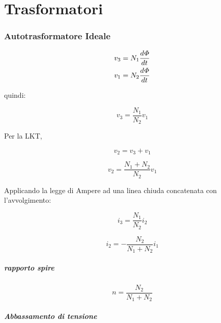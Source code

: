 \chapter{Trasformatori}

\subsection{Autotrasformatore Ideale}

\begin{equation}
  \begin{split}
    v_3 = N_1 \frac{d^{} \varPhi}{d t^{}} \\
    v_1 = N_2 \frac{d^{} \varPhi}{d t^{}}
  \end{split}
\end{equation}

quindi:

\begin{equation}
  v_3 = \frac{N_1}{N_2} v_1
\end{equation}

Per la LKT,

\begin{equation}
  v_2 = v_3 + v_1
\end{equation}

\begin{equation}
  \boxed{
    v_2 = \frac{N_1 + N_2}{N_2} v_1
  }
\end{equation}

Applicando la legge di Ampere ad una linea chiuda concatenata con l'avvolgimento:

\begin{equation}
  i_3 = \frac{N_1}{N_2} i_2
\end{equation}

\begin{equation}
  \boxed{i_2 = - \frac{N_2}{N_1 + N_2} i_1}
\end{equation}

\paragraph{rapporto spire}

\begin{equation}
  n = \frac{N_2}{N_1 + N_2}
\end{equation}

\paragraph{Abbassamento di tensione}

